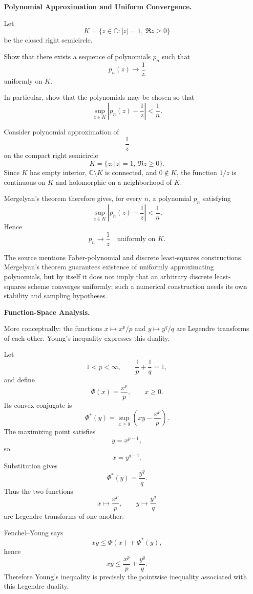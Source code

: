\begin{problem}[CP-II-0447]
\label{prob:cp-ii-0447}
\textbf{Polynomial Approximation and Uniform Convergence.}

\hspace*{1.5em}Let
\[
K=\{z\in\mathbb C:|z|=1,\ \Re z\ge0\}
\]
be the closed right semicircle.

Show that there exists a sequence of polynomials \(p_n\) such that
\[
p_n(z)\longrightarrow\frac1z
\]
uniformly on \(K\).

In particular, show that the polynomials may be chosen so that
\[
\sup_{z\in K}
\left|p_n(z)-\frac1z\right|<\frac1n.
\]
\end{problem}

\begin{solution}
Consider polynomial approximation of
\[
\frac1z
\]
on the compact right semicircle
\[
K=\{z:|z|=1,\ \Re z\ge0\}.
\]
Since \(K\) has empty interior, \(\mathbb C\setminus K\) is connected, and \(0\notin K\),
the function \(1/z\) is continuous on \(K\) and holomorphic on a neighborhood of \(K\).

Mergelyan's theorem therefore gives, for every \(n\), a polynomial \(p_n\) satisfying
\[
\sup_{z\in K}
\left|
p_n(z)-\frac1z
\right|
<
\frac1n.
\]
Hence
\[
\boxed{
p_n\to\frac1z
\quad\text{uniformly on }K.
}
\]

The source mentions Faber-polynomial and discrete least-squares constructions. Mergelyan's
theorem guarantees existence of uniformly approximating polynomials, but by itself it does
not imply that an arbitrary discrete least-squares scheme converges uniformly; such a
numerical construction needs its own stability and sampling hypotheses.
\end{solution}


\begin{problem}[CP-II-0448]
\label{prob:cp-ii-0448}
\textbf{Function-Space Analysis.}

\hspace*{1.5em}More conceptually: the functions $x \mapsto x^p/p$ and
	$y \mapsto y^q/q$ are Legendre transforms of each other.
	Young's inequality expresses this duality.
\end{problem}

\begin{solution}
Let
\[
1<p<\infty,
\qquad
\frac1p+\frac1q=1,
\]
and define
\[
\Phi(x)=\frac{x^p}{p},
\qquad x\ge0.
\]
Its convex conjugate is
\[
\Phi^*(y)
=
\sup_{x\ge0}
\left(
xy-\frac{x^p}{p}
\right).
\]
The maximizing point satisfies
\[
y=x^{p-1},
\]
so
\[
x=y^{q-1}.
\]
Substitution gives
\[
\Phi^*(y)=\frac{y^q}{q}.
\]
Thus the two functions
\[
x\mapsto\frac{x^p}{p},
\qquad
y\mapsto\frac{y^q}{q}
\]
are Legendre transforms of one another.

Fenchel--Young says
\[
xy\le\Phi(x)+\Phi^*(y),
\]
hence
\[
\boxed{
xy\le\frac{x^p}{p}+\frac{y^q}{q}.
}
\]
Therefore Young's inequality is precisely the pointwise inequality associated with this
Legendre duality.
\end{solution}


